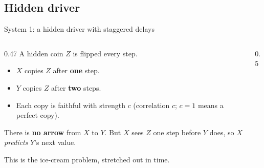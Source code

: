 \documentclass[aspectratio=169,11pt,xcolor={table}]{beamer}
\newcommand{\aside}[1]{{\color{muted}\small #1}}
\begin{document}
\subsection{Hidden driver}

\begin{frame}{System 1: a hidden driver with staggered delays}
  \begin{columns}[c]
    \begin{column}{0.47\textwidth}
      A hidden coin $Z$ is flipped every step.
      \begin{itemize}
        \item $X$ copies $Z$ after \textbf{one} step.
        \item $Y$ copies $Z$ after \textbf{two} steps.
        \item Each copy is faithful with strength $c$ (correlation $c$; $c = 1$ means a perfect copy).
      \end{itemize}
      \medskip
      There is \textbf{no arrow} from $X$ to $Y$. But $X$ sees $Z$ one step before $Y$ does,
      so $X$ \emph{predicts} $Y$'s next value.
      \medskip

      \aside{This is the ice-cream problem, stretched out in time.}
    \end{column}
    \begin{column}{0.5\textwidth}
      \centering
    \end{column}
  \end{columns}
\end{frame}
\end{document}
